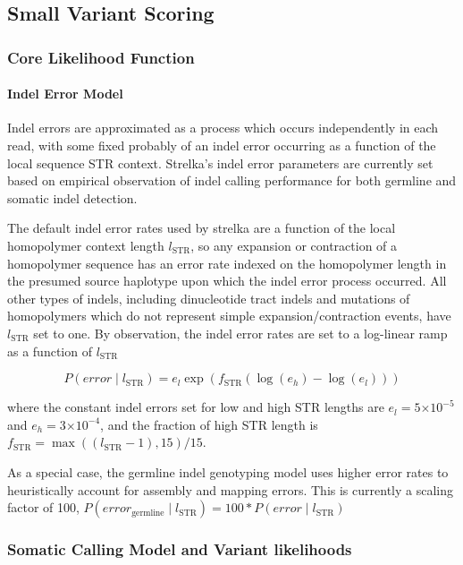 \documentclass{article}
\newcommand{\e}[1]{\ensuremath{\times 10^{#1}}}
\begin{document}
\subsection{Small Variant Scoring}

\subsubsection{Core Likelihood Function}

\paragraph{Indel Error Model}
\label{sec:indel_error}
Indel errors are approximated as a process which occurs independently in each read, with some fixed probably of an indel error occurring as a function of the local sequence STR context. Strelka's indel error parameters are currently set based on empirical observation of indel calling performance for both germline and somatic indel detection.

The default indel error rates used by strelka are a function of the local homopolymer context length $l_{\text{STR}}$, so any expansion or contraction of a homopolymer sequence has an error rate indexed on the homopolymer length in the presumed source haplotype upon which the indel error process occurred. All other types of indels, including dinucleotide tract indels and mutations of homopolymers which do not represent simple expansion/contraction events, have $l_{\text{STR}}$ set to one. By observation, the indel error rates are set to a log-linear ramp as a function of $l_{\text{STR}}$

\begin{equation*}
P(error \mid l_{\text{STR}}) = e_{l} \exp(f_{\text{STR}}(\log(e_{h})-\log(e_{l})))
\end{equation*}

\noindent where the constant indel errors set for low and high STR lengths are $e_{l} = 5\e{-5}$ and $e_{h} = 3\e{-4}$, and the fraction of high STR length is $f_{\text{STR}} = \max((l_{\text{STR}}-1),15)/15$.

As a special case, the germline indel genotyping model uses higher error rates to heuristically account for assembly and mapping errors. This is currently a scaling factor of 100, $P(error_{\text{germline}} \mid l_{\text{STR}}) = 100 * P(error \mid l_{\text{STR}})$


\subsubsection{Somatic Calling Model and Variant likelihoods}
\end{document}
